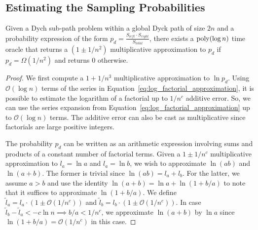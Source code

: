 \subsection{Estimating the Sampling Probabilities}%
\label{sec:computing_probabilities}
\begin{lemma}
\label{lem:probability_approximation_oracle}
Given a Dych sub-path problem within a global Dyck path of size $2n$ and a probability expression of the form
$p_d = \frac{S_{left}\cdot S_{right}}{S_{total}}$, there exists a $\mathrm{poly}(\log n)$ time oracle that returns a
$\left( 1\pm 1/n^2\right)$ multiplicative approximation to $p_d$ if $p_d = \Omega(1/n^2)$ and returns $0$ otherwise.
\end{lemma}
\begin{proof}
We first compute a $1+1/n^3$ multiplicative approximation to $\ln p_d$.
Using $\mathcal O(\log n)$ terms of the series in Equation~\ref{eq:log_factorial_approximation},
it is possible to estimate the logarithm of a factorial up to $1/n^c$ additive error.
So, we can use the series expansion from Equation~\ref{eq:log_factorial_approximation} up to $\mathcal O(\log n)$ terms.
The additive error can also be cast as multiplicative since factorials are large positive integers.

The probability $p_d$ can be written as an arithmetic expression involving sums and products of a constant number of factorial terms.
Given a $1\pm1/n^c$ multiplicative approximation to $l_a = \ln a$ and $l_a = \ln b$, we wish to approximate $\ln(ab)$ and $\ln(a+b)$.
The former is trivial since $\ln(ab) = l_a + l_b$.
For the latter, we assume $a>b$ and use the identity $\ln(a+b) = \ln a + \ln(1+b/a)$ to note that it suffices to approximate $\ln(1+b/a)$.
We define $\tilde l_a = l_a\cdot(1\pm \mathcal O(1/n^c))$ and $\tilde l_b = l_b\cdot(1\pm \mathcal O(1/n^c))$.
In case $\tilde l_b-\tilde l_a < -c\ln n\implies b/a < 1/n^c$,
we approximate $\ln(a+b)$ by $\ln a$ since $\ln(1+b/a) = \mathcal O(1/n^c)$ in this case.


\end{proof}
